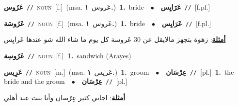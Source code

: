 \documentclass[10pt,a4paper,twoside]{article} %
\begin{document}
\begin{multicols}{2}
{\setlength\topsep{0pt}\textbf{\foreignlanguage{arabic}{عَرُوس}}\ {\color{gray}\texttt{//}\color{black}}\ \textsc{noun}\ [f.]\ \color{gray}(msa. \foreignlanguage{arabic}{عَروس}~\foreignlanguage{arabic}{\textbf{١.}})\color{black}\ \textbf{1.}~bride\ \ $\bullet$\ \ \setlength\topsep{0pt}\textbf{\foreignlanguage{arabic}{عَرَايِس}}\ {\color{gray}\texttt{//}\color{black}}\ [f.pl.]\ } \vspace{2mm}

{\setlength\topsep{0pt}\textbf{\foreignlanguage{arabic}{عَرُوسَة}}\ {\color{gray}\texttt{//}\color{black}}\ \textsc{noun}\ [f.]\ \color{gray}(msa. \foreignlanguage{arabic}{عَروس}~\foreignlanguage{arabic}{\textbf{١.}})\color{black}\ \textbf{1.}~bride\ \ $\bullet$\ \ \setlength\topsep{0pt}\textbf{\foreignlanguage{arabic}{عَرَايِس}}\ {\color{gray}\texttt{//}\color{black}}\ [f.pl.]\  \begin{flushright}\color{gray}\foreignlanguage{arabic}{\textbf{\underline{\foreignlanguage{arabic}{أمثلة}}}: زهوة بتجهز مالايقل عن 30 عَروسة كل يوم ما شاء الله شو عندها عَرايِس}\end{flushright}\color{black}} \vspace{2mm}

{\setlength\topsep{0pt}\textbf{\foreignlanguage{arabic}{عَرُوسِة}}\ {\color{gray}\texttt{//}\color{black}}\ \textsc{noun}\ [f.]\ \textbf{1.}~sandwich (Arayes)\ } \vspace{2mm}

{\setlength\topsep{0pt}\textbf{\foreignlanguage{arabic}{عَرِيس}}\ {\color{gray}\texttt{//}\color{black}}\ \textsc{noun}\ [m.]\ \color{gray}(msa. \foreignlanguage{arabic}{عَريس}~\foreignlanguage{arabic}{\textbf{١.}})\color{black}\ \textbf{1.}~groom\ \ $\bullet$\ \ \setlength\topsep{0pt}\textbf{\foreignlanguage{arabic}{عِرْسَان}}\ {\color{gray}\texttt{//}\color{black}}\ [pl.]\ \textbf{1.}~the bride and the groom\ \ $\bullet$\ \ \setlength\topsep{0pt}\textbf{\foreignlanguage{arabic}{عِرْسَان}}\ {\color{gray}\texttt{//}\color{black}}\ [pl.]\  \begin{flushright}\color{gray}\foreignlanguage{arabic}{\textbf{\underline{\foreignlanguage{arabic}{أمثلة}}}: اجاني كثير عِرْسان وأنا بنت عند أهلي}\end{flushright}\color{black}} \vspace{2mm}


\end{multicols}
\end{document}
